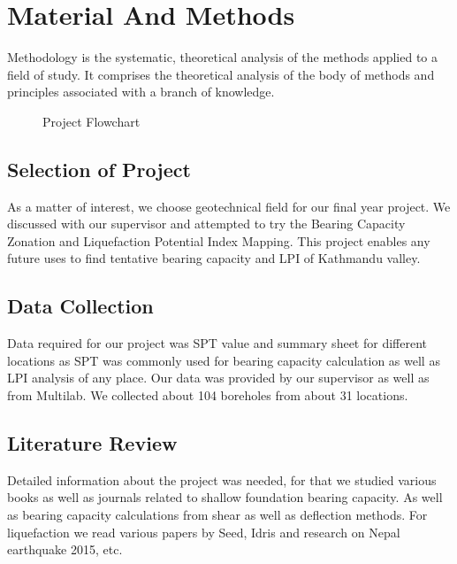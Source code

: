 \chapter{Material And Methods}
Methodology is the systematic, theoretical analysis of the methods applied to a field of study. It comprises the theoretical analysis of the body of methods and principles associated with a branch of knowledge.
\begin{figure}
\caption{Project Flowchart}
\end{figure}

\section{Selection of Project}
As a matter of interest, we choose geotechnical field for our final year project. We discussed with our supervisor and attempted to try the Bearing Capacity Zonation and Liquefaction Potential Index Mapping. This project enables any future uses to find tentative bearing capacity and LPI of Kathmandu valley.

\section{Data Collection}
Data required for our project was SPT value and summary sheet for different locations as SPT was commonly used for bearing capacity calculation as well as LPI analysis of any place. Our data was provided by our supervisor as well as from Multilab. We collected about 104 boreholes from about 31 locations.


\section{Literature Review}
Detailed information about the project was needed, for that we studied various books as well as journals related to shallow foundation bearing capacity. As well as bearing capacity calculations from shear as well as deflection methods. For liquefaction we read various papers by Seed, Idris and research on Nepal earthquake 2015, etc.

